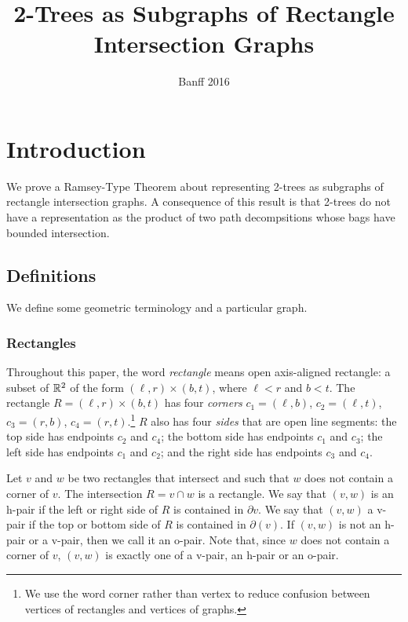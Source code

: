 \documentclass[lotsofwhite]{patmorin}
\title{2-Trees as Subgraphs of Rectangle Intersection Graphs}
\author{Banff 2016}
\begin{document}
\maketitle

\section{Introduction}

We prove a Ramsey-Type Theorem about representing 2-trees as subgraphs
of rectangle intersection graphs.  A consequence of this result is
that 2-trees do not have a representation as the product of two path
decompsitions whose bags have bounded intersection.

\subsection{Definitions}

We define some geometric terminology and a particular graph.

\subsubsection{Rectangles}

Throughout this paper, the word \emph{rectangle} means open axis-aligned
rectangle: a subset of $\mathbb{R}^2$ of the form $(\ell,r)\times (b,t)$,
where $\ell< r$ and $b<t$.  The rectangle $R=(\ell,r)\times (b,t)$
has four \emph{corners} $c_1=(\ell,b)$, $c_2=(\ell,t)$, $c_3=(r,b)$,
$c_4=(r,t)$.\footnote{We use the word corner rather than vertex to reduce
confusion between vertices of rectangles and vertices of graphs.}  $R$
also has four \emph{sides} that are open line segments: the top side
has endpoints $c_2$ and $c_4$; the bottom side has endpoints $c_1$ and
$c_3$; the left side has endpoints $c_1$ and $c_2$; and the right side
has endpoints $c_3$ and $c_4$.

Let $v$ and $w$ be two rectangles that intersect and such that $w$ does
not contain a corner of $v$.  The intersection $R=v\cap w$ is a rectangle.
We say that $(v,w)$ is an h-pair if the left or right side of $R$ is
contained in $\partial v$.  We say that $(v,w)$ a v-pair if the top or
bottom side of $R$ is contained in $\partial(v)$.  If $(v,w)$ is not an
h-pair or a v-pair, then we call it an o-pair.  Note that, since $w$
does not contain a corner of $v$, $(v,w)$ is exactly one of a v-pair,
an h-pair or an o-pair.
\end{document}
